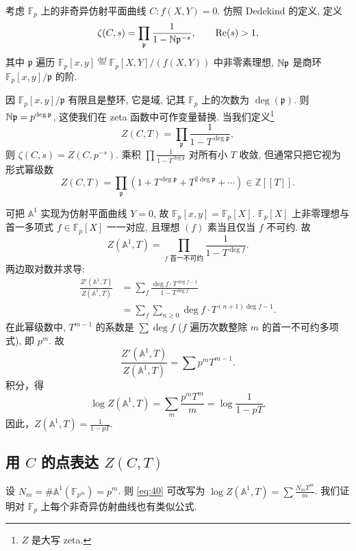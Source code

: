 考虑 $\mathbb{F}_p$ 上的非奇异仿射平面曲线 $C\colon f(X, Y) = 0$. 仿照 Dedekind 的定义, 定义
\[
\zeta(C, s) = \prod_{\mathfrak{p}}\frac{1}{1 - \mathbb{N}\mathfrak{p}^{-s}}, \qquad \operatorname{Re}(s) > 1,
\]
其中 $\mathfrak{p}$ 遍历 $\mathbb{F}_p[x, y] \overset{\text{def}}{=} \mathbb{F}_p[X, Y]/(f(X, Y))$ 中非零素理想, $\mathbb{N}\mathfrak{p}$ 是商环 $\mathbb{F}_p[x, y]/\mathfrak{p}$ 的阶.

因 $\mathbb{F}_p[x, y]/\mathfrak{p}$ 有限且是整环, 它是域, 记其 $\mathbb{F}_p$ 上的次数为 $\deg(\mathfrak{p})$. 则 $\mathbb{N}\mathfrak{p} = p^{\deg\mathfrak{p}}$, 这使我们在 zeta 函数中可作变量替换. 当我们定义\footnote{$Z$ 是大写 zeta.}
\[
Z(C, T) = \prod_{\mathfrak{p}}\frac{1}{1 - T^{\deg\mathfrak{p}}},
\]
则 $\zeta(C, s) = Z(C, p^{-s})$. 乘积 $\prod\frac{1}{1 - T^{\deg\mathfrak{p}}}$ 对所有小 $T$ 收敛, 但通常只把它视为形式幂级数
\[
Z(C, T) = \prod_{\mathfrak{p}}(1 + T^{\deg\mathfrak{p}} + T^{2\deg\mathfrak{p}} + \cdots)\in\mathbb{Z}[[T]].
\]

\begin{example} \label{thm:4.9.7} 
可把 $\mathbb{A}^1$ 实现为仿射平面曲线 $Y = 0$, 故 $\mathbb{F}_p[x, y] = \mathbb{F}_p[X]$. $\mathbb{F}_p[X]$ 上非零理想与首一多项式 $f\in\mathbb{F}_p[X]$ 一一对应, 且理想 $(f)$ 素当且仅当 $f$ 不可约. 故
\[
Z(\mathbb{A}^1, T) = \prod_{f\text{ 首一不可约}}\frac{1}{1 - T^{\deg f}}.
\]
两边取对数并求导:
\begin{align*}
    \frac{Z'(\mathbb{A}^1, T)}{Z(\mathbb{A}^1, T)} & = \sum_f\frac{\deg f\cdot T^{\deg f - 1}}{1 - T^{\deg f}} \\
    & = \sum_f\sum_{n\ge 0}\deg f\cdot T^{(n+1)\deg f - 1}.
\end{align*}
在此幂级数中, $T^{m-1}$ 的系数是 $\sum\deg f$ ($f$ 遍历次数整除 $m$ 的首一不可约多项式), 即 $p^m$. 故
\[
\frac{Z'(\mathbb{A}^1, T)}{Z(\mathbb{A}^1, T)} = \sum p^mT^{m-1}.
\]
积分，得
\begin{equation}\label{eq:40}
\log Z(\mathbb{A}^1, T) = \sum_m\frac{p^mT^m}{m} = \log\frac{1}{1-pT}.
\tag{40}
\end{equation}
因此，$Z(\mathbb{A}^1, T) = \frac{1}{1-pT}$.
\end{example}

\subsection*{用 $C$ 的点表达 $Z(C, T)$}

设 $N_m = \#\mathbb{A}^1(\mathbb{F}_{p^m}) = p^m$. 则 \eqref{eq:40} 可改写为 $\log Z(\mathbb{A}^1, T) = \sum\frac{N_mT^m}{m}$. 我们证明对 $\mathbb{F}_p$ 上每个非奇异仿射曲线也有类似公式.

